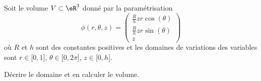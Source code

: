 
\begin{exercice}\label{exoOutilsMath-0116}

    Soit le volume $V\subset\eR^3$ donné par la paramétrisation
    \begin{equation}
        \phi(r,\theta,z)=\begin{pmatrix}
            \frac{ R }{ h }zr\cos(\theta)    \\ 
            \frac{ R }{ h }zr\sin(\theta)    \\ 
            z    
        \end{pmatrix}
    \end{equation}
    où $R$ et $h$ sont des constantes positives et les domaines de variations des variables sont $r\in\mathopen[ 0 , 1 \mathclose]$, $\theta\in\mathopen[ 0 , 2\pi \mathclose]$, $z\in\mathopen[ 0 , h \mathclose]$.

    Décrire le domaine et en calculer le volume.

\end{exercice}
